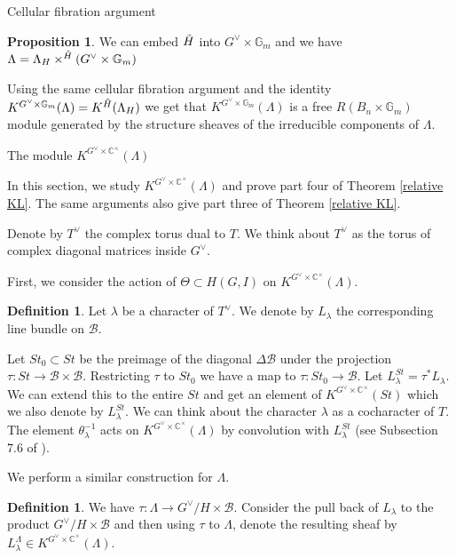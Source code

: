 \documentclass[12pt]{article}
\newcommand{\B}{\mathcal{B}}
\newcommand{\C}{\mathbb{C}}
\newcommand{\<}{\langle}
\renewcommand{\>}{\rangle}
\theoremstyle{plain}
\theoremstyle{definition}
\newtheorem{prop}[theorem]{Proposition}
\newtheorem{defn}[theorem]{Definition}
\begin{document}
\begin{section}{Cellular fibration argument}
\begin{prop}
    We can embed $\Tilde{H}$ into $G^\vee\times\mathbb{G}_m$ and we have  $\Lambda=\Lambda_H\times^{\Tilde{H}}(G^\vee\times\mathbb{G}_m)$
\end{prop}

Using the same cellular fibration argument and the identity $K^{G^\vee\times\mathbb{G}_m}(\Lambda)=K^{\Tilde{H}}(\Lambda_H)$ we get that $K^{G^\vee\times\mathbb{G}_m}(\Lambda)$ is a free $R(B_n\times \mathbb{G}_m)$ module generated by the structure sheaves of the irreducible components of $\Lambda$. 


    
\end{section}

\begin{section}{The module $K^{G^\vee\times \C^\times}(\Lambda)$}\label{s7}

In this section, we study $K^{G^\vee\times \C^\times}(\Lambda)$ and prove part four of Theorem \ref{relative KL}. The same arguments also give part three of Theorem \ref{relative KL}.

Denote by $T^\vee$ the complex torus dual to $T$. We think about $T^\vee$ as the torus of complex diagonal matrices inside $G^\vee$.

First, we consider the action of $\Theta\subset H(G,I)$ on $K^{G^\vee\times \C^\times}(\Lambda)$.

\begin{defn}
    Let $\lambda$ be a character of $T^\vee$. We denote by $L_\lambda$ the corresponding line bundle on $\B$.
\end{defn}

Let $St_0\subset St$ be the preimage of the diagonal $\Delta \B$ under the projection $\tau:St\rightarrow \B\times \B$. Restricting $\tau$ to $St_0$ we have a map to $\tau:St_0\rightarrow\B$. Let $L_\lambda^{St}=\tau^*L_\lambda$. We can extend this to the entire $St$ and get an element of $K^{G^\vee\times\C^\times}(St)$ which we also denote by $L_\lambda^{St}$. We can think about the character $\lambda$ as a cocharacter of $T$. The element $\theta_\lambda^{-1}$ acts on $K^{G^\vee\times\C^\times}(\Lambda)$ by convolution with $L^{St}_\lambda$ (see Subsection 7.6 of \cite{Chriss1997RepresentationTA}).

We perform a similar construction for $\Lambda$.

\begin{defn}
We have $\tau:\Lambda\rightarrow G^\vee/H\times \B$. Consider the pull back of $L_\lambda$ to the product $G^\vee/H\times \B$ and then using $\tau$ to $\Lambda$, denote the resulting sheaf by $L_\lambda^\Lambda\in K^{G^\vee\times\C^\times}(\Lambda)$.


\end{defn}
\end{section}
\end{document}
